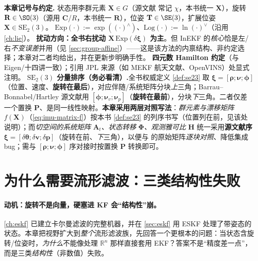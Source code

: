 \begin{note}
\textbf{本章记号与约定.}\;
状态用李群元素 $\mathbf{X}\in G$（源文献\cite{barrau2017invariant} 常记 $\chi$，本书统一 $\mathbf{X}$），旋转 $\mathbf{R}\in\SO(3)$（源用 $\mathbf{C}$/$R$，本书统一 $\mathbf{R}$），位姿 $\mathbf{T}\in\SE(3)$，扩展位姿 $\mathbf{X}\in\mathrm{SE}_2(3)$。
$\mathrm{Exp}(\cdot):=\exp((\cdot)^\wedge)$、$\mathrm{Log}(\cdot):=\ln(\cdot)^\vee$（沿用 \cref{ch:lie}）。
\textbf{扰动方向：全书右扰动 $\mathbf{X}\,\mathrm{Exp}(\delta\boldsymbol{\xi})$ 为主}。但 InEKF 的\emph{核心}恰是左/右\emph{不变误差}并用（见 \cref{sec:group-affine}）——这是该方法的内禀结构、非约定选择；本章对二者均给出，并在更新步明确手性。
\textbf{四元数 Hamilton 约定}（与 Eigen/十四讲一致）；引用 JPL 来源（如 MEKF 航天文献、OpenVINS）处显式注明。
\textbf{$\mathrm{SE}_2(3)$ 分量排序（务必看清）.}\;全书权威定义 \cref{def:se23} 取 $\boldsymbol{\xi}=[\boldsymbol{\rho};\boldsymbol{\nu};\boldsymbol{\phi}]$（位置、速度、\textbf{旋转在最后}），对应伴随/系统矩阵分块\emph{上}三角；Barrau--Bonnabel/Hartley 源文献用 $[\boldsymbol{\phi};\boldsymbol{\nu}_v;\boldsymbol{\nu}_p]$（\textbf{旋转在最前}），分块\emph{下}三角。二者仅差一个置换 $\mathbf{P}$、是同一线性映射。\textbf{本章采用两层对照写法}：\emph{群元素与漂移矩阵} $f(\mathbf{X})$（\cref{eq:imu-matrix-f}）按本书 \cref{def:se23} 的列序书写（位置列在前，见该处说明）；而\emph{切空间的系统矩阵} $\mathbf{A}_t$\emph{、状态转移} $\boldsymbol{\Phi}$\emph{、观测雅可比} $\mathbf{H}$ 统一采用\textbf{源文献序} $\boldsymbol{\xi}=[\delta\boldsymbol{\theta};\delta\mathbf{v};\delta\mathbf{p}]$（旋转在前、\emph{下}三角），以便与 \cite{barrau2017invariant} 的原始矩阵\emph{逐块对照}、降低集成 bug；需与 $[\boldsymbol{\rho};\boldsymbol{\nu};\boldsymbol{\phi}]$ 序对接时按置换 $\mathbf{P}$ 转换即可。
\end{note}

\section{为什么需要流形滤波：三类结构性失败}
\label{sec:why-manifold}

\paragraph{动机：旋转不是向量，硬塞进 KF 会“结构性”崩。}
\cref{ch:eskf} 已建立卡尔曼滤波的完整机器，并在 \cref{sec:eskf} 用 ESKF 处理了带姿态的状态。本章把视野扩大到\emph{整个}流形滤波族，先回答一个更根本的问题：当状态含旋转/位姿时，\emph{为什么}不能像处理 $\mathbb{R}^n$ 那样直接套用 EKF？答案不是“精度差一点”，而是三类\emph{结构性}（非数值）失败\cite{sola2017quaternion}。

